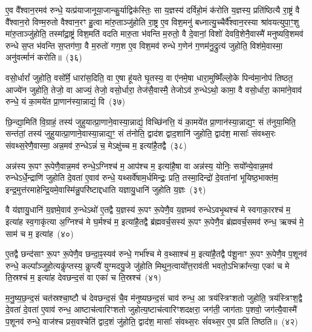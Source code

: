ए॒व वै᳚श्वान॒रमव॑ रुन्धे॒ यत्प्र॑याजानूया॒जान्कु॒र्याद्विक॑स्तिः॒ सा य॒ज्ञस्य॑ दर्विहो॒मं क॑रोति य॒ज्ञस्य॒ प्रति॑ष्ठित्यै रा॒ष्ट्रं वै वै᳚श्वान॒रो विण्म॒रुतो वैश्वान॒रꣳ हु॒त्वा मा॑रु॒ताञ्जु॑होति रा॒ष्ट्र ए॒व विश॒मनु॑ बध्नात्यु॒च्चैर्वै᳚श्वान॒रस्या श्रा॑वयत्युपा॒ꣳ॒शु मा॑रु॒ताञ्जु॑होति॒ तस्मा᳚द्रा॒ष्ट्रं विश॒मति॑ वदति मारु॒ता भ॑वन्ति म॒रुतो॒ वै दे॒वानां॒ विशो॑ देववि॒शेनै॒वास्मै॑ मनुष्यवि॒शमव॑ रुन्धे स॒प्त भ॑वन्ति स॒प्तग॑णा॒ वै म॒रुतो॑ गण॒श ए॒व विश॒मव॑ रुन्धे ग॒णेन॑ ग॒णम॑नु॒द्रुत्य॑ जुहोति॒ विश॑मे॒वास्मा॒ अनु॑वर्त्मानं करोति॥~(३६)

{\anuvakamend[{अग्ने॒ प्रेह्यव॑ स्म दुहे॒ तां प्र॒जा\-प॑तेः सा॒क्षान्म॑नुष्यवि॒शमेक॑विꣳशतिश्च}]}%

वसो॒र्धारां᳚ जुहोति॒ वसो᳚र्मे॒ धारा॑स॒दिति॒ वा ए॒षा हू॑यते घृ॒तस्य॒ वा ए॑नमे॒षा धारा॒मुष्मिँ॑ल्लो॒के पिन्व॑मा॒नोप॑ तिष्ठत॒ आज्ये॑न जुहोति॒ तेजो॒ वा आज्यं॒ तेजो॒ वसो॒र्धारा॒ तेज॑सै॒वास्मै॒ तेजो\-ऽव॑ रु॒न्धे\-ऽथो॒ कामा॒ वै वसो॒र्धारा॒ कामा॑ने॒वाव॑ रुन्धे॒ यं का॒मये॑त प्रा॒णान॑स्या॒न्नाद्यं॒ वि~(३७)

छि॒न्द्या॒मिति॑ वि॒ग्राहं॒ तस्य॑ जुहुयात्प्रा॒णाने॒वास्या॒न्नाद्यं॒ विच्छि॑नत्ति॒ यं का॒मये॑त प्रा॒णान॑स्या॒न्नाद्य॒ꣳ॒ सं त॑नुया॒मिति॒ सन्त॑तां॒ तस्य॑ जुहुयात्प्रा॒णाने॒वास्या॒न्नाद्य॒ꣳ॒ सं त॑नोति॒ द्वाद॑श द्वाद॒शानि॑ जुहोति॒ द्वाद॑श॒ मासाः᳚ संवथ्स॒रः संवथ्स॒रेणै॒वास्मा॒ अन्न॒मव॑ रु॒न्धे\-ऽन्नं॑ च॒ मे\-ऽक्षु॑च्च म॒ इत्या॑है॒तद्वै~(३८)

अन्न॑स्य रू॒पꣳ रू॒पेणै॒वान्न॒मव॑ रुन्धे॒\-ऽग्निश्च॑ म॒ आप॑श्च म॒ इत्या॑है॒षा वा अन्न॑स्य॒ योनिः॒ सयो᳚न्ये॒वान्न॒मव॑ रुन्धे\-ऽर्धे॒न्द्राणि॑ जुहोति दे॒वता॑ ए॒वाव॑ रुन्धे॒ यथ्सर्वे॑षाम॒र्धमिन्द्रः॒ प्रति॒ तस्मा॒दिन्द्रो॑ दे॒वता॑नां भूयिष्ठ॒भाक्त॑म॒ इन्द्र॒मुत्त॑रमाहेन्द्रि॒यमे॒वास्मि॑न्नु॒परि॑ष्टाद्दधाति यज्ञायु॒धानि॑ जुहोति य॒ज्ञः~(३९)

वै य॑ज्ञायु॒धानि॑ य॒ज्ञमे॒वाव॑ रु॒न्धे\-ऽथो॑ ए॒तद्वै य॒ज्ञस्य॑ रू॒पꣳ रू॒पेणै॒व य॒ज्ञमव॑ रुन्धे\-ऽवभृ॒थश्च॑ मे स्वगाका॒रश्च॑ म॒ इत्या॑ह स्व॒गाकृ॑त्या अ॒ग्निश्च॑ मे घ॒र्मश्च॑ म॒ इत्या॑है॒तद्वै ब्र॑ह्मवर्च॒सस्य॑ रू॒पꣳ रू॒पेणै॒व ब्र॑ह्मवर्च॒समव॑ रुन्ध॒ ऋक्च॑ मे॒ साम॑ च म॒ इत्या॑ह~(४०)

ए॒तद्वै छन्द॑साꣳ रू॒पꣳ रू॒पेणै॒व छन्दा॒ꣴ॒स्यव॑ रुन्धे॒ गर्भा᳚श्च मे व॒थ्साश्च॑ म॒ इत्या॑है॒तद्वै प॑शू॒नाꣳ रू॒पꣳ रू॒पेणै॒व प॒शूनव॑ रुन्धे॒ कल्पा᳚ञ्जुहो॒त्यकॢ॑प्तस्य॒ कॢप्त्यै॑ युग्मदयु॒जे जु॑होति मिथुन॒त्वायो᳚त्त॒राव॑ती भवतो॒\-ऽभिक्रा᳚न्त्या॒ एका॑ च मे ति॒स्रश्च॑ म॒ इत्या॑ह देवछन्द॒सं वा एका॑ च ति॒स्रश्च॑~(४१)

म॒नु॒ष्य॒छ॒न्द॒सं चत॑स्रश्चा॒ष्टौ च॑ देवछन्द॒सं चै॒व म॑नुष्यछन्द॒सं चाव॑ रुन्ध॒ आ त्रय॑स्त्रिꣳशतो जुहोति॒ त्रय॑स्त्रिꣳश॒द्वै दे॒वता॑ दे॒वता॑ ए॒वाव॑ रुन्ध॒ आष्टाच॑त्वारिꣳशतो जुहोत्य॒ष्टाच॑त्वारिꣳशदक्षरा॒ जग॑ती॒ जाग॑ताः प॒शवो॒ जग॑त्यै॒वास्मै॑ प॒शूनव॑ रुन्धे॒ वाज॑श्च प्रस॒वश्चेति॑ द्वाद॒शं जु॑होति॒ द्वाद॑श॒ मासाः᳚ संवथ्स॒रः सं॑वथ्स॒र ए॒व प्रति॑ तिष्ठति॥~(४२)

